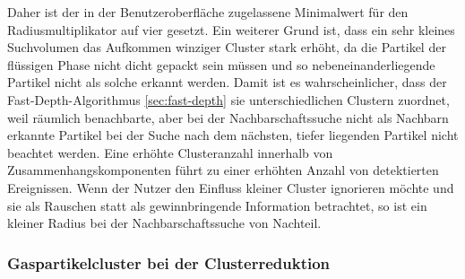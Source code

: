 Daher ist der in der Benutzeroberfläche zugelassene Minimalwert für den Radiusmultiplikator auf vier gesetzt. Ein weiterer Grund ist, dass ein sehr kleines Suchvolumen das Aufkommen winziger Cluster stark erhöht, da die Partikel der flüssigen Phase nicht dicht gepackt sein müssen und so nebeneinanderliegende Partikel nicht als solche erkannt werden. %
Damit ist es wahrscheinlicher, dass der Fast-Depth-Algorithmus \autoref{sec:fast-depth} sie unterschiedlichen Clustern zuordnet, weil räumlich benachbarte, aber bei der Nachbarschaftssuche nicht als Nachbarn erkannte Partikel bei der Suche nach dem nächsten, tiefer liegenden Partikel nicht beachtet werden. Eine erhöhte Clusteranzahl innerhalb von Zusammenhangskomponenten führt zu einer erhöhten Anzahl von detektierten Ereignissen. Wenn der Nutzer den Einfluss kleiner Cluster ignorieren möchte und sie als Rauschen statt als gewinnbringende Information betrachtet, so ist ein kleiner Radius bei der Nachbarschaftssuche von Nachteil. %

\subsubsection*{Gaspartikelcluster bei der Clusterreduktion}  %

